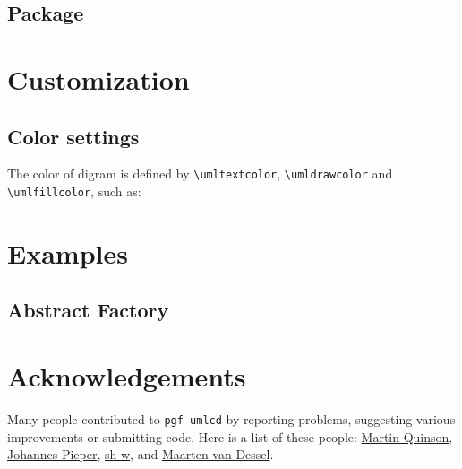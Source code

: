 \documentclass{article}
\newcommand{\demo}[2][1]{
\begin{minipage}{.49\linewidth}
\centering
\resizebox{#1\linewidth}{!}{

}
\end{minipage}
\hspace{0.01\linewidth}
\begin{minipage}{.5\linewidth}

\end{minipage}
}
\newcommand{\example}[1]{
\resizebox{\linewidth}{!}{

}

}
\begin{document}
\subsection{Package}
\demo{package}

\section{Customization}
\subsection{Color settings}
The color of digram is defined by \lstinline|\umltextcolor|, \lstinline|\umldrawcolor| and \lstinline|\umlfillcolor|, such as:

\demo{color} 


\section{Examples}
\subsection{Abstract Factory}
\example{abstract-factory}

\section{Acknowledgements}
Many people contributed to \texttt{pgf-umlcd} by reporting problems,
suggesting various improvements or submitting code. Here is a list of
these people: \href{mailto:martin.quinson@loria.fr}{Martin Quinson},
\href{mailto:johannes_pieper@yahoo.de}{Johannes Pieper},
\href{mailto:lwghsh@gmail.com}{sh w},
and \href{mailto:maartenvandessel@hotmail.com}{Maarten van Dessel}.
\end{document}
